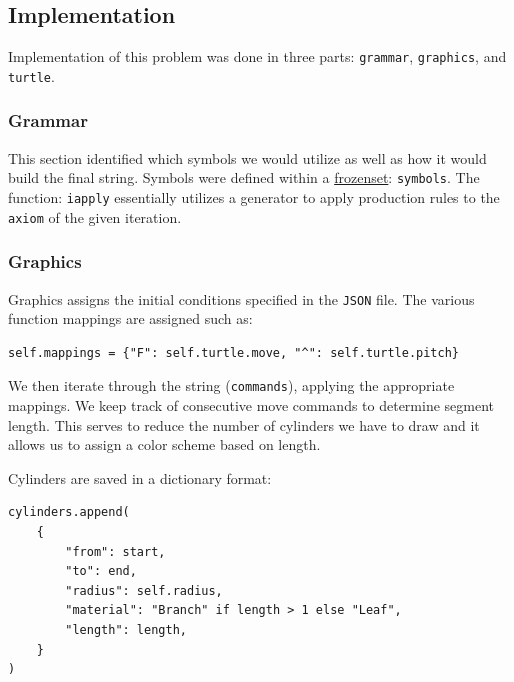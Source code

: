 


\subsection{Implementation}\label{sec:l-sys-implementation}
Implementation of this problem was done in three parts: \texttt{grammar},
\texttt{graphics}, and \texttt{turtle}.

\subsubsection{Grammar}
This section identified which symbols we would utilize as well as how it would
build the final string. Symbols were defined within a
\href{https://docs.python.org/3/library/stdtypes.html#frozenset}{frozenset}:
\texttt{symbols}. The function: \texttt{iapply} essentially
utilizes a generator to apply production rules to the \texttt{axiom} of the
given iteration.

\subsubsection{Graphics}
Graphics assigns the initial conditions specified in the \texttt{JSON} file.
The various function mappings are assigned such as:

\begin{verbatim}
self.mappings = {"F": self.turtle.move, "^": self.turtle.pitch}
\end{verbatim}

We then iterate through the string (\texttt{commands}), applying the
appropriate mappings. We keep track of consecutive move commands to determine
segment length. This serves to reduce the number of cylinders we have to draw
and it allows us to assign a color scheme based on length.

Cylinders are saved in a dictionary format:
\begin{verbatim}
cylinders.append(
    {
        "from": start,
        "to": end,
        "radius": self.radius,
        "material": "Branch" if length > 1 else "Leaf",
        "length": length,
    }
)
\end{verbatim}

